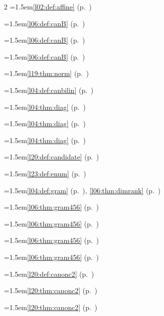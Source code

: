 \begin{multicols}{2}
\hangindent=1.5em\quad \ref{l02:def:affine} (p.~\pageref{l02:def:affine})\par
\hangindent=1.5em\quad \ref{l06:def:canB} (p.~\pageref{l06:def:canB})\par
\hangindent=1.5em\quad \ref{l06:def:canB} (p.~\pageref{l06:def:canB})\par
\hangindent=1.5em\quad \ref{l06:def:canB} (p.~\pageref{l06:def:canB})\par
\hangindent=1.5em\quad \ref{l19:thm:norm} (p.~\pageref{l19:thm:norm})\par
\hangindent=1.5em\quad \ref{l04:def:canbilin} (p.~\pageref{l04:def:canbilin})\par
\hangindent=1.5em\quad \ref{l04:thm:diag} (p.~\pageref{l04:thm:diag})\par
\hangindent=1.5em\quad \ref{l04:thm:diag} (p.~\pageref{l04:thm:diag})\par
\hangindent=1.5em\quad \ref{l04:thm:diag} (p.~\pageref{l04:thm:diag})\par
\hangindent=1.5em\quad \ref{l20:def:candidate} (p.~\pageref{l20:def:candidate})\par
\hangindent=1.5em\quad \ref{l23:def:enum} (p.~\pageref{l23:def:enum})\par
\hangindent=1.5em\quad \ref{l04:def:gram} (p.~\pageref{l04:def:gram}), \ref{l06:thm:dimrank} (p.~\pageref{l06:thm:dimrank})\par
\hangindent=1.5em\quad \ref{l06:thm:gram456} (p.~\pageref{l06:thm:gram456})\par
\hangindent=1.5em\quad \ref{l06:thm:gram456} (p.~\pageref{l06:thm:gram456})\par
\hangindent=1.5em\quad \ref{l06:thm:gram456} (p.~\pageref{l06:thm:gram456})\par
\hangindent=1.5em\quad \ref{l06:thm:gram456} (p.~\pageref{l06:thm:gram456})\par
\hangindent=1.5em\quad \ref{l20:def:canonc2} (p.~\pageref{l20:def:canonc2})\par
\hangindent=1.5em\quad \ref{l20:thm:canonc2} (p.~\pageref{l20:thm:canonc2})\par
\hangindent=1.5em\quad \ref{l20:thm:canonc2} (p.~\pageref{l20:thm:canonc2})\par

\end{multicols}
